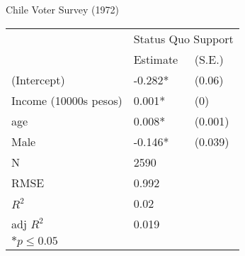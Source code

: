 \caption{ Chile Voter Survey (1972) }\label{ regrlabl }
\begin{table}
 \begin{tabular}{*{3}{l}}
 \hline
                &\multicolumn{2}{c}{Status Quo Support}   \\
                &Estimate &(S.E.) \\
 \hline
 \hline
  (Intercept)    & -0.282*  &   (0.06) \\
  Income (10000s pesos)   &  0.001*  &   (0) \\
  age            &  0.008*  &   (0.001) \\
  Male           & -0.146*  &   (0.039) \\
 \hline 
 N                &2590      &       \\
 RMSE            &0.992        & \\
 $R^2$           &0.02        & \\
 adj $R^2$       &0.019        & \\
 \hline
 \hline
 
 \multicolumn{2}{l}{${*}  p \le 0.05$   }\\
 \end{tabular}
 \end{table}